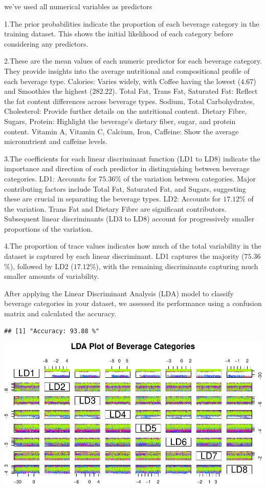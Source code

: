 \documentclass[
]{article}
\begin{document}
we've used all numerical variables as predictors

1.The prior probabilities indicate the proportion of each beverage
category in the training dataset. This shows the initial likelihood of
each category before considering any predictors.

2.These are the mean values of each numeric predictor for each beverage
category. They provide insights into the average nutritional and
compositional profile of each beverage type. Calories: Varies widely,
with Coffee having the lowest (\(4.67\)) and Smoothies the highest
(\(282.22\)). Total Fat, Trans Fat, Saturated Fat: Reflect the fat
content differences across beverage types. Sodium, Total Carbohydrates,
Cholesterol: Provide further details on the nutritional content. Dietary
Fibre, Sugars, Protein: Highlight the beverage's dietary fiber, sugar,
and protein content. Vitamin A, Vitamin C, Calcium, Iron, Caffeine: Show
the average micronutrient and caffeine levels.

3.The coefficients for each linear discriminant function (LD1 to LD8)
indicate the importance and direction of each predictor in
distinguishing between beverage categories. LD1: Accounts for
\(75.36\)\% of the variation between categories. Major contributing
factors include Total Fat, Saturated Fat, and Sugars, suggesting these
are crucial in separating the beverage types. LD2: Accounts for
\(17.12\)\% of the variation. Trans Fat and Dietary Fibre are
significant contributors. Subsequent linear discriminants (LD3 to LD8)
account for progressively smaller proportions of the variation.

4.The proportion of trace values indicates how much of the total
variability in the dataset is captured by each linear discriminant. LD1
captures the majority (\(75.36\)\%), followed by LD2 (\(17.12\)\%), with
the remaining discriminants capturing much smaller amounts of
variability.

After applying the Linear Discriminant Analysis (LDA) model to classify
beverage categories in your dataset, we assessed its performance using a
confusion matrix and calculated the accuracy.

\begin{verbatim}
## [1] "Accuracy: 93.88 %"
\end{verbatim}

\begin{center}\includegraphics{Statistical_Learning_Final_Report_files/figure-latex/lda_evaluation-1} \end{center}
\end{document}
